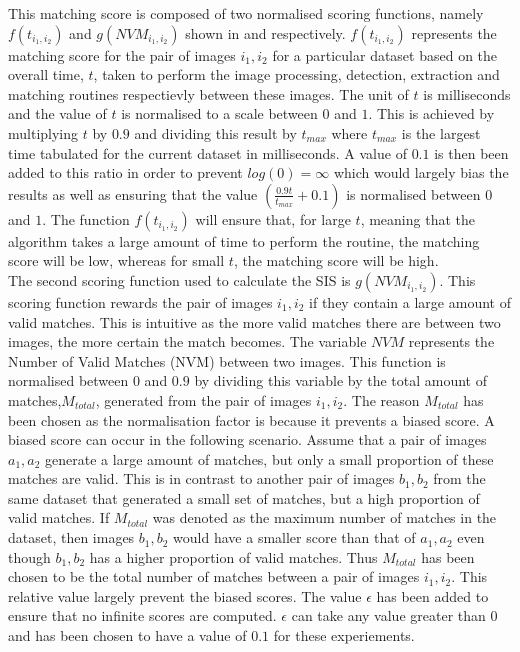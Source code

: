 \documentclass{article}
\begin{document}
This matching score is composed of two normalised scoring functions, namely $f(t_{i_1, i_2})$ and $g(NVM_{i_1, i_2})$ shown in  and  respectively. $f(t_{i_1, i_2})$ represents the matching score for the pair of images $i_1, i_2$ for a particular dataset based on the overall time, $t$, taken to perform the image processing, detection, extraction and matching routines respectievly between these images. The unit of $t$ is milliseconds and the value of $t$ is normalised to a scale between $0$ and $1$. This is achieved by multiplying $t$ by $0.9$ and dividing this result by $t_{max}$ where $t_{max}$ is the largest time tabulated for the current dataset in milliseconds. A value of $0.1$ is then been added to this ratio in order to  prevent $log(0) = \infty$ which would largely bias the results as well as ensuring that the value $(\frac{0.9 t}{t_{max}} + 0.1)$ is normalised between $0$ and $1$. The function $f(t_{i_1, i_2})$ will ensure that, for large $t$, meaning that the algorithm takes a large amount of time to perform the routine, the matching score will be low, whereas for small $t$, the matching score will be high. \\

The second scoring function used to calculate the SIS is $g(NVM_{i_1, i_2})$. This scoring function rewards the pair of images $i_1, i_2$ if they contain a large amount of valid matches. This is intuitive as the more valid matches there are between two images, the more certain the match becomes. The variable $NVM$ represents the Number of Valid Matches (NVM) between two images. This function is normalised between $0$ and  $0.9$ by dividing this variable by the total amount of matches,$M_{total}$, generated from the pair of images $i_1, i_2$. The reason $M_{total}$ has been chosen as the normalisation factor is because it prevents a biased score. A biased score can occur in the following scenario. Assume that a pair of images $a_1, a_2$ generate a large amount of matches, but only a small proportion of these matches are valid. This is in contrast to another pair of images $b_1, b_2$ from the same dataset that generated a small set of matches, but a high proportion of valid matches. If $M_{total}$ was denoted as the maximum number of matches in the dataset, then images $b_1, b_2$ would have a smaller score than that of $a_1, a_2$ even though $b_1, b_2$ has a higher proportion of valid matches. Thus $M_{total}$ has been chosen to be the total number of matches between a pair of images $i_1, i_2$. This relative value largely prevent the biased scores. The value $\epsilon$ has been added to ensure that no infinite scores are computed. $\epsilon$ can take any value greater than $0$ and has been chosen to have a value of $0.1$ for these experiements.\\ 
\end{document}

